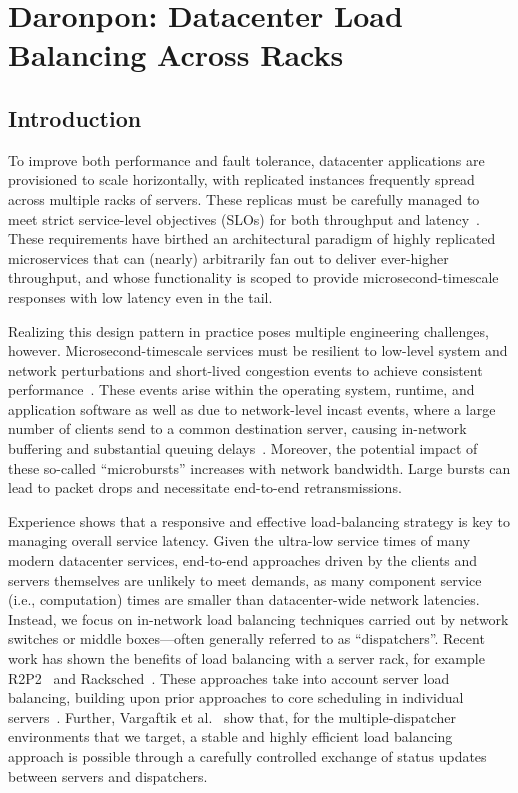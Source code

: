 \chapter{Daronpon: Datacenter Load Balancing Across Racks}
\label{chap:daronpon}

\newcommand{\toolname}{Daronpon}
\newcommand{\systemname}{Daronpon}

\section{Introduction}
\label{sec:intro}

To improve both performance and fault tolerance, datacenter
applications are provisioned to scale horizontally, with replicated
instances frequently spread across multiple racks of servers.  These
replicas must be carefully managed to meet strict service-level
objectives (SLOs) for both throughput and
latency~\cite{killer_microseconds,tail_at_scale}. These requirements
have birthed an architectural paradigm of highly replicated
microservices that can (nearly) arbitrarily fan out to deliver
ever-higher throughput, and whose functionality is scoped to provide
microsecond-timescale responses with low latency even in the tail.

Realizing this design pattern in practice poses multiple engineering
challenges, however.  Microsecond-timescale services must be resilient
to low-level system and network perturbations and short-lived
congestion events to achieve consistent
performance~\cite{facebook_microburst}.  These events arise within the
operating system, runtime, and application software as well as due to
network-level incast events, where a large number of clients send to a
common destination server, causing in-network buffering and
substantial queuing delays~\cite{facebook_memcache}.  Moreover, the
potential impact of these so-called ``microbursts'' increases with
network bandwidth.  Large bursts can lead to packet drops and
necessitate end-to-end retransmissions.

Experience shows that a responsive and effective load-balancing
strategy is key to managing overall service latency.  Given the
ultra-low service times of many modern datacenter services, end-to-end
approaches driven by the clients and servers themselves are unlikely
to meet demands, as many component service (i.e., computation) times
are smaller than datacenter-wide network latencies. Instead, we focus
on in-network load balancing techniques carried out by network
switches or middle boxes---often generally referred to as
``dispatchers''.  Recent work has shown the benefits of load balancing
with a server rack, for example R2P2~\cite{r2p2} and
Racksched~\cite{racksched}.  These approaches take into account server
load balancing, building upon prior approaches to core scheduling in
individual servers~\cite{IX,shinjuku,shenango,seda}. Further,
Vargaftik et al.~\cite{lsq} show that, for the multiple-dispatcher
environments that we target, a stable and highly efficient load
balancing approach is possible through a carefully controlled exchange
of status updates between servers and dispatchers.

